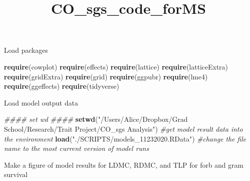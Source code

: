 \documentclass[
]{article}
\title{CO\_sgs\_code\_forMS}
\author{}
\date{\vspace{-2.5em}}
\newenvironment{Shaded}{\begin{snugshade}}{\end{snugshade}}
\newcommand{\CommentTok}[1]{\textcolor[rgb]{0.56,0.35,0.01}{\textit{#1}}}
\newcommand{\KeywordTok}[1]{\textcolor[rgb]{0.13,0.29,0.53}{\textbf{#1}}}
\newcommand{\NormalTok}[1]{#1}
\newcommand{\StringTok}[1]{\textcolor[rgb]{0.31,0.60,0.02}{#1}}
\begin{document}
\maketitle

Load packages

\begin{Shaded}
\begin{Highlighting}[]
\KeywordTok{require}\NormalTok{(cowplot)}
\KeywordTok{require}\NormalTok{(effects)}
\KeywordTok{require}\NormalTok{(lattice)}
\KeywordTok{require}\NormalTok{(latticeExtra)}
\KeywordTok{require}\NormalTok{(gridExtra)}
\KeywordTok{require}\NormalTok{(grid)}
\KeywordTok{require}\NormalTok{(ggpubr)}
\KeywordTok{require}\NormalTok{(lme4)}
\KeywordTok{require}\NormalTok{(ggeffects)}
\KeywordTok{require}\NormalTok{(tidyverse)}
\end{Highlighting}
\end{Shaded}

Load model output data

\begin{Shaded}
\begin{Highlighting}[]
\CommentTok{\#\#\#\# set wd \#\#\#\#}
\KeywordTok{setwd}\NormalTok{(}\StringTok{"/Users/Alice/Dropbox/Grad School/Research/Trait Project/CO\_sgs Analysis"}\NormalTok{)}
\CommentTok{\#get model result data into the environment}
\KeywordTok{load}\NormalTok{(}\StringTok{"./SCRIPTS/models\_11232020.RData"}\NormalTok{) }\CommentTok{\#change the file name to the most current version of model runs}
\end{Highlighting}
\end{Shaded}

Make a figure of model results for LDMC, RDMC, and TLP for forb and gram
survival
\end{document}
